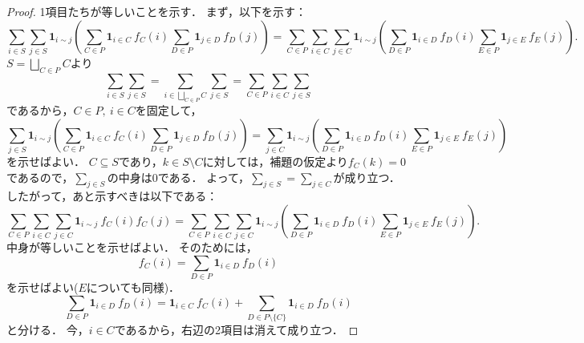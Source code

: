 \begin{proof}
  1項目たちが等しいことを示す．
  まず，以下を示す：
  \begin{equation}
    \sum_{i \in S} \sum_{j \in S} \bm{1}_{i \sim j} \left( \sum_{C \in P} \bm{1}_{i \in C}\ f_C(i) \sum_{D \in P} \bm{1}_{j \in D}\ f_D(j) \right)
    = \sum_{C \in P} \sum_{i \in C} \sum_{j \in C} \bm{1}_{i \sim j} \left( \sum_{D \in P} \bm{1}_{i \in D}\ f_D(i) \sum_{E \in P} \bm{1}_{j \in E}\ f_E(j) \right).
  \end{equation}
  $S = \displaystyle \bigsqcup_{C \in P} C$より
  \begin{equation}
    \sum_{i \in S} \sum_{j \in S}
    = \sum_{i \in \bigsqcup_{C \in P} C} \sum_{j \in S}
    = \sum_{C \in P} \sum_{i \in C} \sum_{j \in S}
  \end{equation}
  であるから，$C \in P,\ i \in C$を固定して，
  \begin{equation}
    \sum_{j \in S} \bm{1}_{i \sim j} \left( \sum_{C \in P} \bm{1}_{i \in C}\ f_C(i) \sum_{D \in P} \bm{1}_{j \in D}\ f_D(j) \right)
    = \sum_{j \in C} \bm{1}_{i \sim j} \left( \sum_{D \in P} \bm{1}_{i \in D}\ f_D(i) \sum_{E \in P} \bm{1}_{j \in E}\ f_E(j) \right)
  \end{equation}
  を示せばよい．
  $C \subseteq S$であり，$k \in S \setminus C$に対しては，補題の仮定より$f_C(k) = 0$であるので，$\sum_{j \in S}$の中身は$0$である．
  よって，$\sum_{j \in S} = \sum_{j \in C}$が成り立つ．
  したがって，あと示すべきは以下である：
  \begin{equation}
    \sum_{C \in P} \sum_{i \in C} \sum_{j \in C} \bm{1}_{i \sim j}\ f_C(i) f_C(j)
    = \sum_{C \in P} \sum_{i \in C} \sum_{j \in C} \bm{1}_{i \sim j} \left( \sum_{D \in P} \bm{1}_{i \in D}\ f_D(i) \sum_{E \in P} \bm{1}_{j \in E}\ f_E(j) \right).
  \end{equation}
  中身が等しいことを示せばよい．
  そのためには，
  \begin{equation}
    f_C(i)
    = \sum_{D \in P} \bm{1}_{i \in D}\ f_D(i)
  \end{equation}
  を示せばよい($E$についても同様)．
  \begin{equation}
    \sum_{D \in P} \bm{1}_{i \in D}\ f_D(i)
    = \bm{1}_{i \in C}\ f_C(i) + \sum_{D \in P \setminus \{C\}} \bm{1}_{i \in D}\ f_D(i)
  \end{equation}
  と分ける．
  今，$i \in C$であるから，右辺の2項目は消えて成り立つ．


\end{proof}
